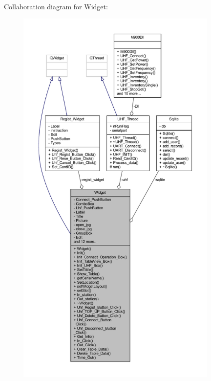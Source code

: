 Collaboration diagram for Widget\+:
\nopagebreak
\begin{figure}[H]
\begin{center}
\leavevmode
\includegraphics[height=550pt]{class_widget__coll__graph}
\end{center}
\end{figure}
